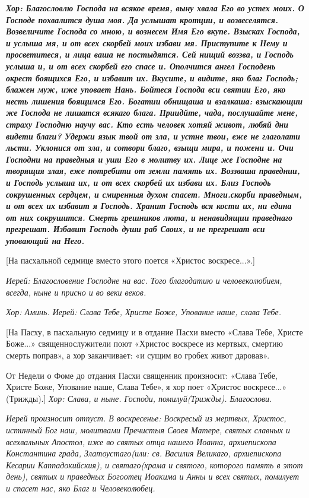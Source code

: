 \bfseries  \normalfont{}\itshape  Хор:\normalfont{} Благословлю Господа на всякое время, выну хвала Его во устех моих. О Господе похвалится душа моя. Да услышат кротции, и возвеселятся. Возвеличите Господа со мною, и вознесем Имя Его вкупе. Взысках Господа, и услыша мя, и от всех скорбей моих избави мя. Приступите к Нему и просветитеся, и лица ваша не постыдятся. Сей нищий воззва, и Господь услыша и, и от всех скорбей его спасе и. Ополчится ангел Господень окрест боящихся Его, и избавит их. Вкусите, и видите, яко благ Господь; блажен муж, иже уповает Нань. Бойтеся Господа вси святии Его, яко несть лишения боящимся Его. Богатии обнищаша и взалкаша: взыскающии же Господа не лишатся всякаго блага. Приидйте, чада, послушайте мене, страху Господню научу вас. Кто есть человек хотяй живот, любяй дни видети благи? Удержи язык твой от зла, и устне твои, еже не глаголати льсти. Уклонися от зла, и сотвори благо, взыщи мира, и пожени и. Очи Господни на праведныя и уши Его в молитву их. Лице же Господне на творящия злая, еже потребити от земли память их. Воззваша праведнии, и Господь услыша их, и от всех скорбей их избави их. Близ Господь сокрушенных сердцем, и смиренныя духом спасет. Многи.скорби праведным, и от всех их избавит я Господь. Хранит Господь вся кости их, ни едина от них сокрушится. Смерть грешников люта, и ненавидящии праведнаго прегрешат. Избавит Господь души раб Своих, и не прегрешат вси уповающий на Него.


  [На пасхальной седмице вместо этого поется «Христос воскресе...».]


 \itshape  Иерей:\normalfont{} Благословение Господне на вас. Того благодатию и человеколюбием, всегда, ныне и присно и во веки веков.


\itshape  Хор:\normalfont{} Аминь. \itshape  Иерей:\normalfont{} Слава Тебе, Христе Боже, Упование наше, слава Тебе.


    [На Пасху, в пасхальную седмицу и в отдание Пасхи вместо «Слава Тебе, Христе Боже...» священнослужители поют «Христос воскресе из мертвых, смертию смерть поправ», а хор заканчивает: «и сущим во гробех живот даровав». 


    От Недели о Фоме до отдания Пасхи священник произносит: «Слава Тебе, Христе Боже, Упование наше, Слава Тебе», я хор поет «Христос воскресе...» (Трижды).] \itshape  Хор: Слава, и ныне.\normalfont{} Господи, помилуй\itshape  (Трижды).\normalfont{} Благослови. 




\itshape  Иерей произносит отпуст. В воскресенье:\normalfont{} Воскресый из мертвых, Христос, истинный Бог наш, молитвами Пречистыя Своея Матере, святых славных и всехвальных Апостол, иже во святых отца нашего Иоанна, архиепископа Константина града, Златоустаго\itshape  (или:\normalfont{} св. Василия Великаго, архиепископа Кесарии Каппадокийския), и святаго\itshape  (храма и святого, которого память в этот день),\normalfont{} святых и праведных Богоотец Иоакима и Анны и всех святых, помилует и спасет нас, яко Благ и Человеколюбец.


